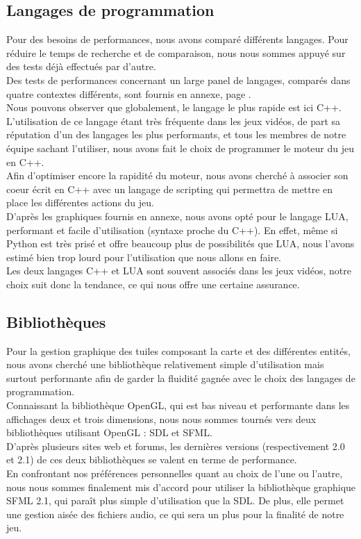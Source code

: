 \documentclass[a4paper]{memoir}
\begin{document}
			\subsection{Langages de programmation}
				Pour des besoins de performances, nous avons comparé différents langages. Pour réduire le temps de recherche et de comparaison, nous nous sommes appuyé sur des tests déjà effectués par d'autre.\\
				Des tests de performances concernant un large panel de langages, comparés dans quatre contextes différents, sont fournis en annexe, page \pageref{fig:analyse}.\\
				Nous pouvons observer que globalement, le langage le plus rapide est ici C++. L'utilisation de ce langage étant très fréquente dans les jeux vidéos, de part sa réputation d'un des langages les plus performants, et tous les membres de notre équipe sachant l'utiliser, nous avons fait le choix de programmer le moteur du jeu en C++.\\
				Afin d'optimiser encore la rapidité du moteur, nous avons cherché à associer son coeur écrit en C++ avec un langage de scripting qui permettra de mettre en place les différentes actions du jeu.\\ D'après les graphiques fournis en annexe, nous avons opté pour le langage LUA, performant et facile d'utilisation (syntaxe proche du C++). En effet, même si Python est très prisé et offre beaucoup plus de possibilités que LUA, nous l'avons estimé bien trop lourd pour l'utilisation que nous allons en faire.\\
				Les deux langages C++ et LUA sont souvent associés dans les jeux vidéos, notre choix suit donc la tendance, ce qui nous offre une certaine assurance.

			\subsection{Bibliothèques}
				Pour la gestion graphique des tuiles composant la carte et des différentes entités, nous avons cherché une bibliothèque relativement simple d'utilisation mais surtout performante afin de garder la fluidité gagnée avec le choix des langages de programmation.\\
				Connaissant la bibliothèque OpenGL, qui est bas niveau et performante dans les affichages deux et trois dimensions, nous nous sommes tournés vers deux bibliothèques utilisant OpenGL : SDL et SFML.\\
				D'après plusieurs sites web et forums, les dernières versions (respectivement 2.0 et 2.1) de ces deux bibliothèques se valent en terme de performance.\\
				En confrontant nos préférences personnelles quant au choix de l'une ou l'autre, nous nous sommes finalement mis d'accord pour utiliser la bibliothèque graphique SFML 2.1, qui paraît plus simple d'utilisation que la SDL. De plus, elle permet une gestion aisée des fichiers audio, ce qui sera un plus pour la finalité de notre jeu.
			
\end{document}
